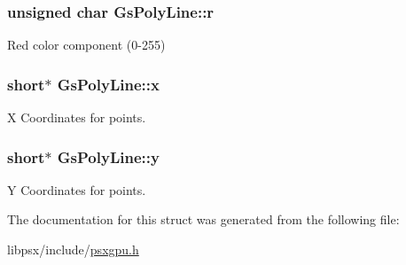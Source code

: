 \subsubsection[{r}]{\setlength{\rightskip}{0pt plus 5cm}unsigned char Gs\+Poly\+Line\+::r}\label{structGsPolyLine_a952fee47dff8f921dc3ed3696c11f45f}


Red color component (0-\/255) 

\hypertarget{structGsPolyLine_a59e6713f08107aab17305c134e8125d8}{}
\subsubsection[{x}]{\setlength{\rightskip}{0pt plus 5cm}short$\ast$ Gs\+Poly\+Line\+::x}\label{structGsPolyLine_a59e6713f08107aab17305c134e8125d8}


X Coordinates for points. 

\hypertarget{structGsPolyLine_a994b4bf37b4107426d1edaccd58997cd}{}
\subsubsection[{y}]{\setlength{\rightskip}{0pt plus 5cm}short$\ast$ Gs\+Poly\+Line\+::y}\label{structGsPolyLine_a994b4bf37b4107426d1edaccd58997cd}


Y Coordinates for points. 



The documentation for this struct was generated from the following file\+:\begin{DoxyCompactItemize}
\item 
libpsx/include/\hyperlink{psxgpu_8h}{psxgpu.\+h}\end{DoxyCompactItemize}

